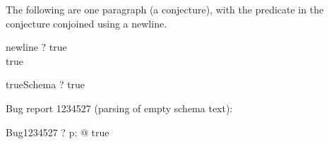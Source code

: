 The following are one paragraph (a conjecture), with the predicate in
the conjecture conjoined using a newline.

\begin{theorem}{newline}
  \vdash? true \\ true
\end{theorem}

\begin{theorem}{trueSchema}
  \vdash? true \\ [X, Y : \nat]
\end{theorem}

Bug report 1234527 (parsing of empty schema text):

\begin{theorem}{Bug1234527}
  \vdash? \forall p: \power [ ] @ true
\end{theorem}
